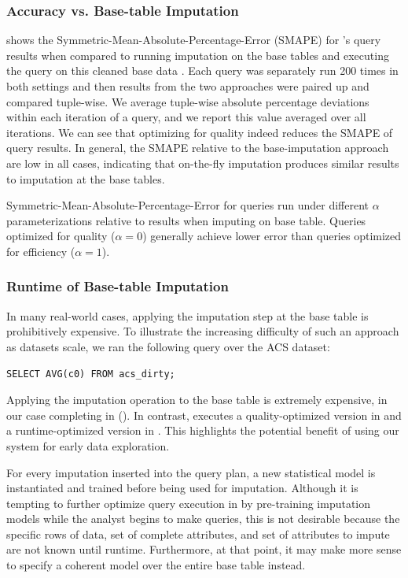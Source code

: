 \subsubsection{Accuracy vs. Base-table Imputation}

 shows the Symmetric-Mean-Absolute-Percentage-Error (SMAPE) for \ProjectName{}'s query results when compared to running
imputation on the base tables and executing the query on this cleaned base data .
Each query was separately run 200 times in both settings and then results from the two approaches were paired up and compared tuple-wise.
We average tuple-wise absolute percentage deviations within each iteration of a query, and we report this value averaged over all iterations.
We can see that optimizing for quality indeed reduces the SMAPE of query results.
In general, the SMAPE relative to the base-imputation approach are low in all cases, indicating that on-the-fly imputation produces
similar results to imputation at the base tables.

\begin{table}
\centering

\caption{Symmetric-Mean-Absolute-Percentage-Error for queries run under different $\alpha$
    parameterizations relative to results when imputing on base table. Queries optimized for quality ($\alpha=0$) generally achieve
    lower error than queries optimized for efficiency ($\alpha=1$).}
\label{table:smape}
\end{table}

\subsubsection{Runtime of Base-table Imputation}
In many real-world cases, applying the imputation step at the base table is prohibitively
expensive.
To illustrate the increasing difficulty of such an approach as datasets scale, we ran the following query over the ACS dataset:
\begin{lstlisting}[breaklines]
SELECT AVG(c0) FROM acs_dirty;
\end{lstlisting}
Applying the imputation operation to the base table is extremely expensive, in our case
completing in \acsbaseresultminutes{} (). In contrast, \ProjectName{} executes a quality-optimized version
in \acsimputedbzeroresult{} and a runtime-optimized version in \acsimputedboneresult{}. This highlights the potential
benefit of using our system for early data exploration.

For every imputation inserted into the query plan, a new statistical model is instantiated and trained before being used for imputation.
Although it is tempting to further optimize query execution in \ProjectName{} by pre-training imputation models while the analyst begins to make queries,
this is not desirable because the specific rows of data, set of complete attributes, and set of attributes to impute are not known until runtime.
Furthermore, at that point, it may make more sense to specify a coherent model over the entire base table instead. 

